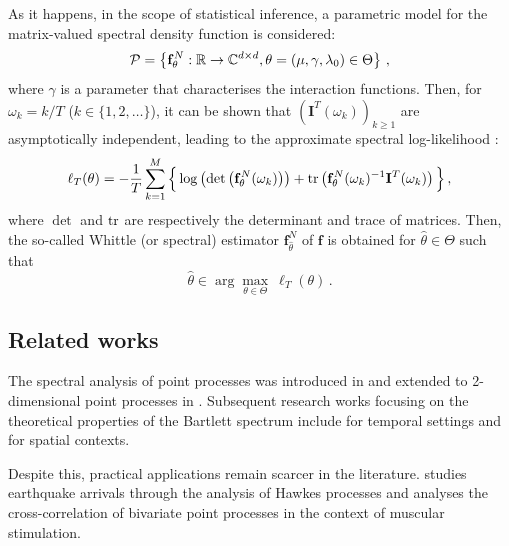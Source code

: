         As it happens, in the scope of statistical inference, a parametric model for the matrix-valued spectral density function is considered:
        \[
            \mathcal{P} = \left\{
              \mathbf{f}_\theta^N : {\mathbb R} \to \mathbb C^{d \times d},
              \theta = (\mu, \gamma, \lambda_0)\in \Theta
            \right\} \,,
        \]
        where $\gamma$ is a parameter that characterises the interaction functions.
        Then, for $\omega_k = k/T$ ($k \in \{1, 2, \dots\}$), it can be shown that $(\mathbf I^T(\omega_k))_{k \geq 1}$ are asymptotically independent,
        leading to the approximate spectral log-likelihood \parencite{Brillinger2012, Duker2019, Villani2022}:
        \begin{equation}\label{eq:chap4_spectral_log_likelihood}
	        \ell_T(\theta) = -\frac{1}{T} \sum_{k=1}^{M}
	        \Big\{
	          \log\left(\det\left(\mathbf{f}_\theta^N(\omega_k)\right)\right) +
	          \operatorname{tr}\left(\mathbf{f}_\theta^N(\omega_k)^{-1}\mathbf{I}^T(\omega_k)\right)
	        \Big\} \,,
        \end{equation}
        where $\det$ and $\operatorname{tr}$ are respectively the determinant and trace of matrices.
        Then, the so-called Whittle (or spectral) estimator $\mathbf f_{\hat \theta}^N$ of $\mathbf f$ \parencite{Whittle1952} is obtained for \(\hat \theta \in \Theta\) such that
        \[
          \hat \theta \in \arg\max_{\theta \in \Theta}~ \ell_T (\theta) \,.
        \]
         
        
        

      \subsection{Related works}
      \label{sec:chap4_related_works}
        The spectral analysis of point processes was introduced in \textcite{Bartlett1963} and extended to 2-dimensional point processes in \textcite{Bartlett1964}.
        Subsequent research works focusing on the theoretical properties of the Bartlett spectrum include \textcite{Daley1971, DaleyV1, Tuan1981} for temporal settings and \textcite{Mugglestone1996, Mugglestone2001, Rajala2023} for spatial contexts.
        
        Despite this, practical applications remain scarcer in the literature.
        \textcite{Adamopoulos1976} studies earthquake arrivals through the analysis of Hawkes processes and \textcite{Karavasilis2007} analyses the cross-correlation of bivariate point processes in the context of muscular stimulation.
        
